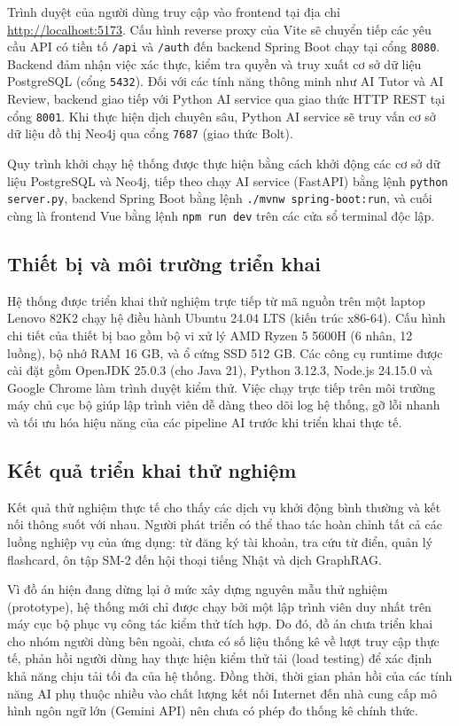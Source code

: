 \documentclass[../DoAn.tex]{subfiles}
\begin{document}
Trình duyệt của người dùng truy cập vào frontend tại địa chỉ \url{http://localhost:5173}. Cấu hình reverse proxy của Vite sẽ chuyển tiếp các yêu cầu API có tiền tố \texttt{/api} và \texttt{/auth} đến backend Spring Boot chạy tại cổng \texttt{8080}. Backend đảm nhận việc xác thực, kiểm tra quyền và truy xuất cơ sở dữ liệu PostgreSQL (cổng \texttt{5432}). Đối với các tính năng thông minh như AI Tutor và AI Review, backend giao tiếp với Python AI service qua giao thức HTTP REST tại cổng \texttt{8001}. Khi thực hiện dịch chuyên sâu, Python AI service sẽ truy vấn cơ sở dữ liệu đồ thị Neo4j qua cổng \texttt{7687} (giao thức Bolt). 

Quy trình khởi chạy hệ thống được thực hiện bằng cách khởi động các cơ sở dữ liệu PostgreSQL và Neo4j, tiếp theo chạy AI service (FastAPI) bằng lệnh \texttt{python server.py}, backend Spring Boot bằng lệnh \texttt{./mvnw spring-boot:run}, và cuối cùng là frontend Vue bằng lệnh \texttt{npm run dev} trên các cửa sổ terminal độc lập.

\subsection{Thiết bị và môi trường triển khai}
\label{subsection:4.5.2}

Hệ thống được triển khai thử nghiệm trực tiếp từ mã nguồn trên một laptop Lenovo 82K2 chạy hệ điều hành Ubuntu 24.04 LTS (kiến trúc x86-64). Cấu hình chi tiết của thiết bị bao gồm bộ vi xử lý AMD Ryzen 5 5600H (6 nhân, 12 luồng), bộ nhớ RAM 16 GB, và ổ cứng SSD 512 GB. Các công cụ runtime được cài đặt gồm OpenJDK 25.0.3 (cho Java 21), Python 3.12.3, Node.js 24.15.0 và Google Chrome làm trình duyệt kiểm thử. Việc chạy trực tiếp trên môi trường máy chủ cục bộ giúp lập trình viên dễ dàng theo dõi log hệ thống, gỡ lỗi nhanh và tối ưu hóa hiệu năng của các pipeline AI trước khi triển khai thực tế.

\subsection{Kết quả triển khai thử nghiệm}
\label{subsection:4.5.3}

Kết quả thử nghiệm thực tế cho thấy các dịch vụ khởi động bình thường và kết nối thông suốt với nhau. Người phát triển có thể thao tác hoàn chỉnh tất cả các luồng nghiệp vụ của ứng dụng: từ đăng ký tài khoản, tra cứu từ điển, quản lý flashcard, ôn tập SM-2 đến hội thoại tiếng Nhật và dịch GraphRAG.

Vì đồ án hiện đang dừng lại ở mức xây dựng nguyên mẫu thử nghiệm (prototype), hệ thống mới chỉ được chạy bởi một lập trình viên duy nhất trên máy cục bộ phục vụ công tác kiểm thử tích hợp. Do đó, đồ án chưa triển khai cho nhóm người dùng bên ngoài, chưa có số liệu thống kê về lượt truy cập thực tế, phản hồi người dùng hay thực hiện kiểm thử tải (load testing) để xác định khả năng chịu tải tối đa của hệ thống. Đồng thời, thời gian phản hồi của các tính năng AI phụ thuộc nhiều vào chất lượng kết nối Internet đến nhà cung cấp mô hình ngôn ngữ lớn (Gemini API) nên chưa có phép đo thống kê chính thức.
\end{document}
